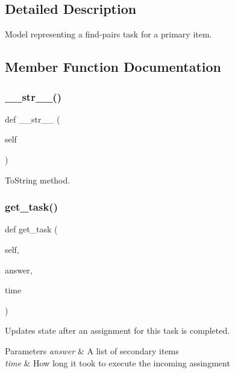 \subsection{Detailed Description}
Model representing a find-\/pairs task for a primary item. 

\subsection{Member Function Documentation}
\mbox{\label{classjoinapp_1_1models_1_1task__management__models_1_1_find_pairs_task_a23e8041ce1015febe4fdace3225714f9}} 
\subsubsection{\texorpdfstring{\_\_str\_\_()}{\_\_str\_\_()}}
{\footnotesize\ttfamily def \+\_\+\+\_\+str\+\_\+\+\_\+ (\begin{DoxyParamCaption}\item[{}]{self }\end{DoxyParamCaption})}



To\+String method. 

\mbox{\label{classjoinapp_1_1models_1_1task__management__models_1_1_find_pairs_task_a5c2eb6f87a32af834dd29469a6189f0c}} 
\subsubsection{\texorpdfstring{get\_task()}{get\_task()}}
{\footnotesize\ttfamily def get\+\_\+task (\begin{DoxyParamCaption}\item[{}]{self,  }\item[{}]{answer,  }\item[{}]{time }\end{DoxyParamCaption})}



Updates state after an assignment for this task is completed. 


\begin{DoxyParams}{Parameters}
{\em answer} & A list of secondary items \\
\hline
{\em time} & How long it took to execute the incoming assingment \\
\hline
\end{DoxyParams}
\mbox{\label{classjoinapp_1_1models_1_1task__management__models_1_1_find_pairs_task_a0725a782a5d789d4b49b1f38bbfcb5f0}} 
